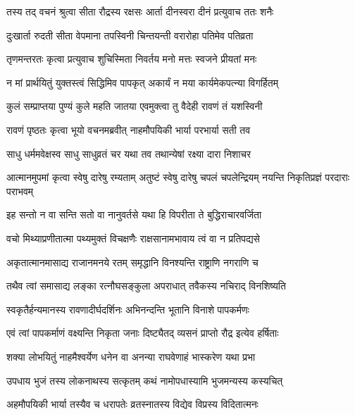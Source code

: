 
\twolineshloka
{तस्य तद् वचनं श्रुत्वा सीता रौद्रस्य रक्षसः}
{आर्ता दीनस्वरा दीनं प्रत्युवाच ततः शनैः} %

\twolineshloka
{दुःखार्ता रुदती सीता वेपमाना तपस्विनी}
{चिन्तयन्ती वरारोहा पतिमेव पतिव्रता} %

\twolineshloka
{तृणमन्तरतः कृत्वा प्रत्युवाच शुचिस्मिता}
{निवर्तय मनो मत्तः स्वजने प्रीयतां मनः} %

\twolineshloka
{न मां प्रार्थयितुं युक्तस्त्वं सिद्धिमिव पापकृत्}
{अकार्यं न मया कार्यमेकपत्न्या विगर्हितम्} %

\twolineshloka
{कुलं सम्प्राप्तया पुण्यं कुले महति जातया}
{एवमुक्त्वा तु वैदेही रावणं तं यशस्विनी} %

\twolineshloka
{रावणं पृष्ठतः कृत्वा भूयो वचनमब्रवीत्}
{नाहमौपयिकी भार्या परभार्या सती तव} %

\twolineshloka
{साधु धर्ममवेक्षस्व साधु साधुव्रतं चर}
{यथा तव तथान्येषां रक्ष्या दारा निशाचर} %

\threelineshloka
{आत्मानमुपमां कृत्वा स्वेषु दारेषु रम्यताम्}
{अतुष्टं स्वेषु दारेषु चपलं चपलेन्द्रियम्}
{नयन्ति निकृतिप्रज्ञं परदाराः पराभवम्} %

\twolineshloka
{इह सन्तो न वा सन्ति सतो वा नानुवर्तसे}
{यथा हि विपरीता ते बुद्धिराचारवर्जिता} %

\twolineshloka
{वचो मिथ्याप्रणीतात्मा पथ्यमुक्तं विचक्षणैः}
{राक्षसानामभावाय त्वं वा न प्रतिपद्यसे} %

\twolineshloka
{अकृतात्मानमासाद्य राजानमनये रतम्}
{समृद्धानि विनश्यन्ति राष्ट्राणि नगराणि च} %

\twolineshloka
{तथैव त्वां समासाद्य लङ्का रत्नौघसङ्कुला}
{अपराधात् तवैकस्य नचिराद् विनशिष्यति} %

\twolineshloka
{स्वकृतैर्हन्यमानस्य रावणादीर्घदर्शिनः}
{अभिनन्दन्ति भूतानि विनाशे पापकर्मणः} %

\twolineshloka
{एवं त्वां पापकर्माणं वक्ष्यन्ति निकृता जनाः}
{दिष्ट्यैतद् व्यसनं प्राप्तो रौद्र इत्येव हर्षिताः} %

\twolineshloka
{शक्या लोभयितुं नाहमैश्वर्येण धनेन वा}
{अनन्या राघवेणाहं भास्करेण यथा प्रभा} %

\twolineshloka
{उपधाय भुजं तस्य लोकनाथस्य सत्कृतम्}
{कथं नामोपधास्यामि भुजमन्यस्य कस्यचित्} %

\twolineshloka
{अहमौपयिकी भार्या तस्यैव च धरापतेः}
{व्रतस्नातस्य विद्येव विप्रस्य विदितात्मनः} %

